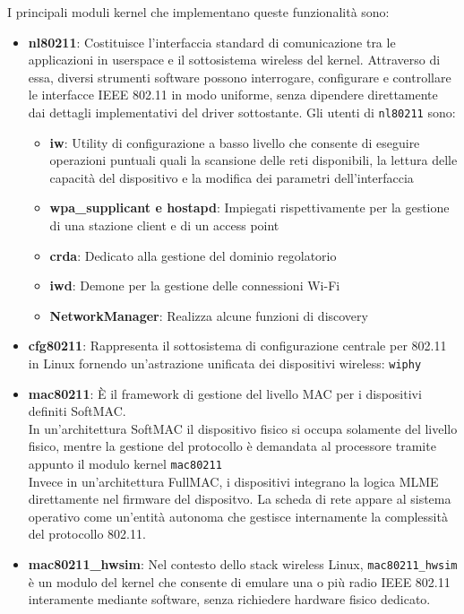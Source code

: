 \documentclass[12pt,a4paper,twoside]{book}
\newcommand{\hwsim}{\mbox{\texttt{mac80211\_hwsim}}\xspace}
\begin{document}
\begin{onehalfspace}
I principali moduli kernel che implementano queste funzionalità sono:
\begin{itemize}
    \item \textbf{nl80211}: Costituisce l'interfaccia standard di comunicazione tra le applicazioni in userspace e il sottosistema wireless del kernel. Attraverso di essa, diversi strumenti software possono interrogare, configurare e controllare le interfacce IEEE 802.11 in modo uniforme, senza dipendere direttamente dai dettagli implementativi del driver sottostante. Gli utenti di \texttt{nl80211} sono:
    \begin{itemize}
        \item \textbf{iw}: Utility di configurazione a basso livello che consente di eseguire operazioni puntuali quali la scansione delle reti disponibili, la lettura delle capacità del dispositivo e la modifica dei parametri dell'interfaccia
        \item \textbf{wpa\_supplicant e hostapd}: Impiegati rispettivamente per la gestione di una stazione client e di un access point
        \item \textbf{crda}: Dedicato alla gestione del dominio regolatorio
        \item \textbf{iwd}: Demone per la gestione delle connessioni Wi-Fi
        \item \textbf{NetworkManager}: Realizza alcune funzioni di discovery
    \end{itemize}
    \item \textbf{cfg80211}: Rappresenta il sottosistema di configurazione centrale per 802.11 in Linux fornendo un'astrazione unificata dei dispositivi wireless: \texttt{wiphy} 
    \item \textbf{mac80211}: È il framework di gestione del livello MAC per i dispositivi definiti SoftMAC.
    \\
    In un'architettura SoftMAC il dispositivo fisico si occupa solamente del livello fisico, mentre la gestione del protocollo è demandata al processore tramite appunto il modulo kernel \texttt{mac80211}
    \\
    Invece in un'architettura FullMAC, i dispositivi integrano la logica MLME direttamente nel firmware del dispositvo. La scheda di rete appare al sistema operativo come un'entità autonoma che gestisce internamente la complessità del protocollo 802.11.
    \item \textbf{mac80211\_hwsim}: Nel contesto dello stack wireless Linux, \hwsim è un modulo del kernel che consente di emulare una o più radio IEEE 802.11 interamente mediante software, senza richiedere hardware fisico dedicato.

\end{itemize}
\end{onehalfspace}
\end{document}
